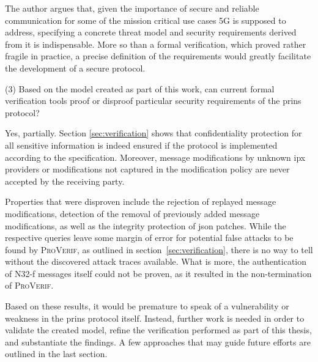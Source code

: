 The author argues that, given the importance of secure and reliable communication for some of the mission critical use cases 5G is supposed to address, specifying a concrete threat model and security requirements derived from it is indispensable.
More so than a formal verification, which proved rather fragile in practice, a precise definition of the requirements would greatly facilitate the development of a secure protocol.\bigskip

\noindent
(3) Based on the model created as part of this work, can current formal verification tools proof or disproof particular security requirements of the \gls{prins} protocol?

Yes, partially.
Section \ref{sec:verification} shows that confidentiality protection for all sensitive information is indeed ensured if the protocol is implemented according to the specification.
Moreover, message modifications by unknown \gls{ipx} providers or modifications not captured in the modification policy are never accepted by the receiving party.

Properties that were disproven include the rejection of replayed message modifications, detection of the removal of previously added message modifications, as well as the integrity protection of \gls{json} patches.
While the respective queries leave some margin of error for potential false attacks to be found by \textsc{ProVerif}, as outlined in section~\ref{sec:verification}, there is no way to tell without the discovered attack traces available.
What is more, the authentication of N32-f messages itself could not be proven, as it resulted in the non-termination of \textsc{ProVerif}.

Based on these results, it would be premature to speak of a vulnerability or weakness in the \gls{prins} protocol itself.
Instead, further work is needed in order to validate the created model, refine the verification performed as part of this thesis, and substantiate the findings.
A few approaches that may guide future efforts are outlined in the last section.